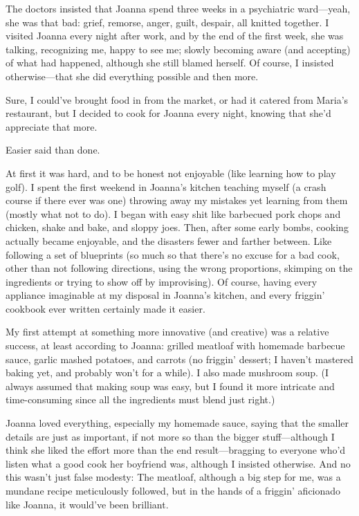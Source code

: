 The doctors insisted that Joanna spend three weeks in a psychiatric
ward---yeah, she was that bad: grief, remorse, anger, guilt, despair,
all knitted together. I visited Joanna every night after work, and by
the end of the first week, she was talking, recognizing me, happy to see
me; slowly becoming aware (and accepting) of what had happened, although
she still blamed herself. Of course, I insisted otherwise---that she did
everything possible and then more.

Sure, I could've brought food in from the market, or had it catered from
Maria's restaurant, but I decided to cook for Joanna every night,
knowing that she'd appreciate that more.

Easier said than done.

At first it was hard, and to be honest not enjoyable (like learning how
to play golf). I spent the first weekend in Joanna's kitchen teaching
myself (a crash course if there ever was one) throwing away my mistakes
yet learning from them (mostly what not to do). I began with easy shit
like barbecued pork chops and chicken, shake and bake, and sloppy joes.
Then, after some early bombs, cooking actually became enjoyable, and the
disasters fewer and farther between. Like following a set of blueprints
(so much so that there's no excuse for a bad cook, other than not
following directions, using the wrong proportions, skimping on the
ingredients or trying to show off by improvising). Of course, having
every appliance imaginable at my disposal in Joanna's kitchen, and every
friggin' cookbook ever written certainly made it easier.

My first attempt at something more innovative (and creative) was a
relative success, at least according to Joanna: grilled meatloaf with
homemade barbecue sauce, garlic mashed potatoes, and carrots (no
friggin' dessert; I haven't mastered baking yet, and probably won't for
a while). I also made mushroom soup. (I always assumed that making soup
was easy, but I found it more intricate and time-consuming since all the
ingredients must blend just right.)

Joanna loved everything, especially my homemade sauce, saying that the
smaller details are just as important, if not more so than the bigger
stuff---although I think she liked the effort more than the end
result---bragging to everyone who'd listen what a good cook her
boyfriend was, although I insisted otherwise. And no this wasn't just
false modesty: The meatloaf, although a big step for me, was a mundane
recipe meticulously followed, but in the hands of a friggin' aficionado
like Joanna, it would've been brilliant.

